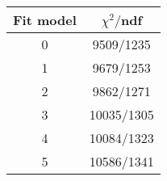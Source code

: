 \begin{tabular}{c|c}
Fit model & $\chi^2/$ndf \\
\hline
0 & 9509/1235\\
1 & 9679/1253\\
2 & 9862/1271\\
3 & 10035/1305\\
4 & 10084/1323\\
5 & 10586/1341\\
\end{tabular}
